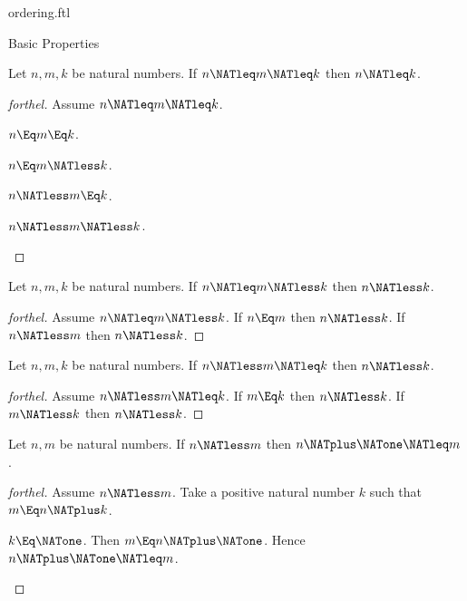 \documentclass{stex}
\begin{document}
\begin{smodule}{ordering.ftl}
\begin{sfragment}{Basic Properties}
  \begin{proposition}[forthel]
    Let $n, m, k$ be natural numbers.
    If $n \NATleq m \NATleq k$ then $n \NATleq k$.
  \end{proposition}
  \begin{proof}[forthel]
    Assume $n \NATleq m \NATleq k$.
    \begin{case}{$n \Eq m \Eq k$.} \end{case}
    \begin{case}{$n \Eq m \NATless k$.} \end{case}
    \begin{case}{$n \NATless m \Eq k$.} \end{case}
    \begin{case}{$n \NATless m \NATless k$.} \end{case}
  \end{proof}

  \begin{proposition}[forthel]
    Let $n, m, k$ be natural numbers.
    If $n \NATleq m \NATless k$ then $n \NATless k$.
  \end{proposition}
  \begin{proof}[forthel]
    Assume $n \NATleq m \NATless k$.
    If $n \Eq m$ then $n \NATless k$.
    If $n \NATless m$ then $n \NATless k$.
  \end{proof}

  \begin{proposition}[forthel]
    Let $n, m, k$ be natural numbers.
    If $n \NATless m \NATleq k$ then $n \NATless k$.
  \end{proposition}
  \begin{proof}[forthel]
    Assume $n \NATless m \NATleq k$.
    If $m \Eq k$ then $n \NATless k$.
    If $m \NATless k$ then $n \NATless k$.
  \end{proof}

  \begin{proposition}[forthel]
    Let $n, m$ be natural numbers.
    If $n \NATless m$ then $n \NATplus \NATone \NATleq m$.
  \end{proposition}
  \begin{proof}[forthel]
    Assume $n \NATless m$.
    Take a positive natural number $k$ such that $m \Eq n \NATplus k$.

    \begin{case}{$k \Eq \NATone$.}
      Then $m \Eq n \NATplus \NATone$.
      Hence $n \NATplus \NATone \NATleq m$.
    \end{case}


\end{proof}
\end{sfragment}
\end{smodule}
\end{document}
